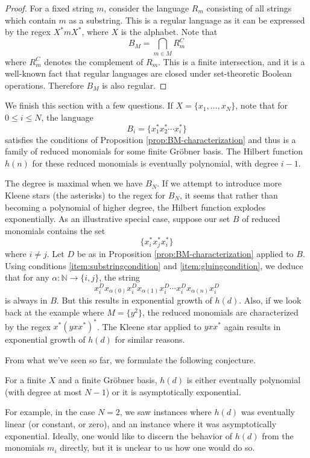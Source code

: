 \begin{proof}
	For a fixed string $m$, consider the language $R_{m}$ consisting of all strings which contain $m$ as a substring. This is a regular language as it can be expressed by the regex $X^* m X^*$, where $X$ is the alphabet. Note that
	\[
	B_M = \bigcap_{m \in M} R_{m}^C
	\]
	where $R_m^C$ denotes the complement of $R_m$. This is a finite intersection, and it is a well-known fact that regular languages are closed under set-theoretic Boolean operations. Therefore $B_M$ is also regular.
\end{proof}

We finish this section with a few questions. If $X = \{x_1,\ldots,x_N\}$, note that for $0 \leq i \leq N$, the language
\[
	B_i = \{ x_1^* x_2^* \cdots x_i^* \}
\]
satisfies the conditions of Proposition \ref{prop:BM-characterization} and thus is a family of reduced monomials for some finite Gr\"obner basis. The Hilbert function $h(n)$ for these reduced monomials is eventually polynomial, with degree $i - 1$.

The degree is maximal when we have $B_N$. If we attempt to introduce more Kleene stars (the asterisks) to the regex for $B_N$, it seems that rather than becoming a polynomial of higher degree, the Hilbert function explodes exponentially. As an illustrative special case, suppose our set $B$ of reduced monomials contains the set
\[
	\{x_i^* x_j^* x_i^*\}
\]
where $i\neq j$.
Let $D$ be as in Proposition \ref{prop:BM-characterization} applied to $B$. Using conditions \eqref{item:substringcondition} and \eqref{item:gluingcondition}, we deduce that for any $\alpha\colon \mathbb{N} \to \{i,j\}$, the string
\[
	x_i^D x_{\alpha(0)} x_i^D x_{\alpha(1)} x_i^D \cdots x_i^D x_{\alpha(n)} x_i^D 
\]
is always in $B$. But this results in exponential growth of $h(d)$. Also, if we look back at the example where $M = \{y^2\}$, the reduced monomials are characterized by the regex $x^* (yxx^*)^*$. The Kleene star applied to $yxx^*$ again results in exponential growth of $h(d)$ for similar reasons.

From what we've seen so far, we formulate the following conjecture.
\begin{conj}
	For a finite $X$ and a finite Gr\"obner basis, $h(d)$ is either eventually polynomial (with degree at most $N-1$) or it is asymptotically exponential.
\end{conj}
For example, in the case $N = 2$, we saw instances where $h(d)$ was eventually linear (or constant, or zero), and an instance where it was asymptotically exponential.
Ideally, one would like to discern the behavior of $h(d)$ from the monomials $m_i$ directly, but it is unclear to us how one would do so.

